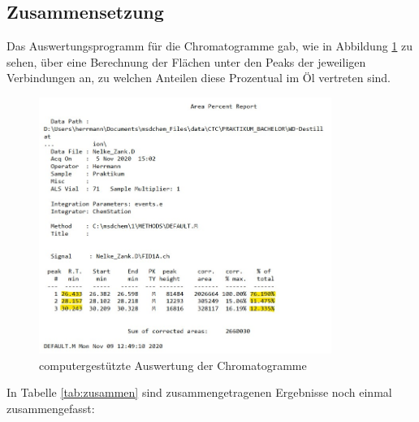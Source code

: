 \subsection*{Zusammensetzung}
Das Auswertungsprogramm für die Chromatogramme gab, wie in Abbildung \ref{fig:zusammen} zu sehen, über eine Berechnung der Flächen unter den Peaks der jeweiligen Verbindungen an, zu welchen Anteilen diese Prozentual im Öl vertreten sind.

\begin{figure}[h!]
	\centering
	\includegraphics[width=0.85\textwidth]{img/zusammen}
	\caption{computergestützte Auswertung der Chromatogramme}
	\label{fig:zusammen}
\end{figure}
\FloatBarrier

In Tabelle \ref{tab:zusammen} sind zusammengetragenen Ergebnisse noch einmal zusammengefasst:

\begin{table}[h!]
	\renewcommand*{\arraystretch}{1.2}
	\centering
	\caption{Zusammengefasste Ergebnisse der Gaschromatografie und der \mbox{Massenspektroskopie}}
	\label{tab:zusammen}
\end{table}%
\FloatBarrier




